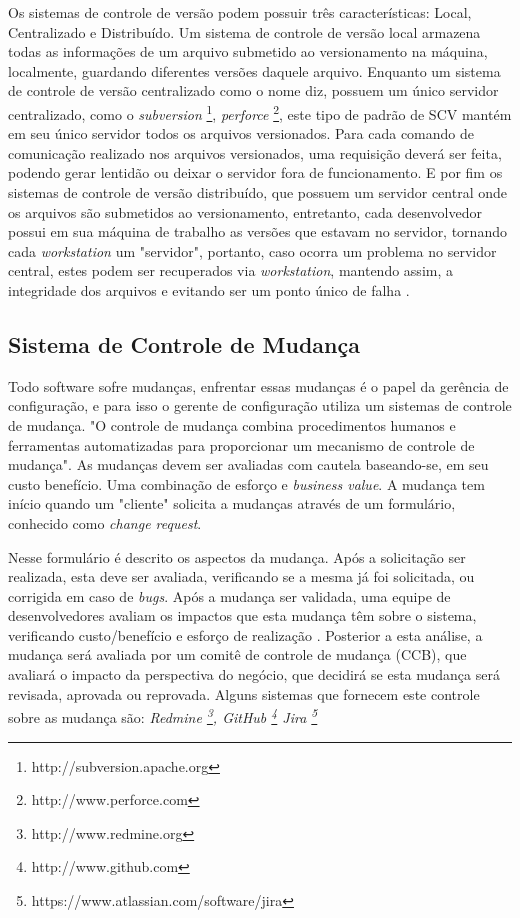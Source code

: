 Os sistemas de controle de versão podem possuir três características: Local, Centralizado e Distribuído. Um sistema de controle de versão local armazena todas as informações de um arquivo submetido ao versionamento na máquina, localmente, guardando diferentes versões daquele arquivo. Enquanto um sistema de controle de versão centralizado como o nome diz, possuem um único servidor centralizado, como o \textit{subversion} \footnote{http://subversion.apache.org}, \textit{perforce} \footnote{http://www.perforce.com}, este tipo de padrão de SCV mantém em seu único servidor todos os arquivos versionados. Para cada comando de comunicação realizado nos arquivos versionados, uma requisição deverá ser feita, podendo gerar lentidão ou deixar o servidor fora de funcionamento. E por fim os sistemas de controle de versão distribuído, que possuem um servidor central onde os arquivos são submetidos ao versionamento, entretanto, cada desenvolvedor possui em sua máquina de trabalho as versões que estavam no servidor, tornando cada \textit{workstation} um "servidor", portanto, caso ocorra um problema no servidor central, estes podem ser recuperados via \textit{workstation}, mantendo assim, a integridade dos arquivos e evitando ser um ponto único de falha \cite{git}	.


\subsection{Sistema de Controle de Mudança}
Todo software sofre mudanças, enfrentar essas mudanças é o papel da gerência de configuração, e para isso o gerente de configuração utiliza um sistemas de controle de mudança. "O controle de mudança combina procedimentos humanos e ferramentas automatizadas para proporcionar um mecanismo de controle de mudança"\space {}. As mudanças devem ser avaliadas com cautela baseando-se, em seu custo benefício. Uma combinação de esforço e \textit{business value}. A mudança tem início quando um "cliente" solicita a mudanças através de um formulário, conhecido como \textit{change request}.

 Nesse formulário é descrito os aspectos da mudança. Após a solicitação ser realizada, esta deve ser avaliada, verificando se a mesma já foi solicitada, ou corrigida em caso de \textit{bugs}. Após a mudança ser validada, uma equipe de desenvolvedores avaliam os impactos que esta mudança têm sobre o sistema, verificando custo/benefício e esforço de realização \cite{sommerville2011}. Posterior a esta análise, a mudança será avaliada por um comitê de controle de mudança (CCB), que avaliará o impacto da perspectiva do negócio, que decidirá se esta mudança será revisada, aprovada ou reprovada. Alguns sistemas que fornecem este controle sobre as mudança são: \textit{Redmine \footnote{http://www.redmine.org}, GitHub \footnote{http://www.github.com} Jira \footnote{https://www.atlassian.com/software/jira}}
